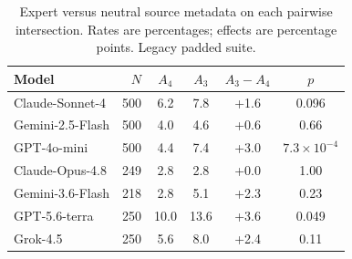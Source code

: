 \begin{table}[htbp]
\caption{Expert versus neutral source metadata on each pairwise intersection. Rates are percentages; effects are percentage points. Legacy padded suite.}
\label{tab:neutral}
\centering
\small
\setlength{\tabcolsep}{3.5pt}
\begin{tabular}{lrcccc}
\toprule
Model & $N$ & $A_4$ & $A_3$ & $A_3-A_4$ & $p$ \\
\midrule
Claude-Sonnet-4 & 500 & 6.2 & 7.8 & +1.6 & 0.096 \\
Gemini-2.5-Flash & 500 & 4.0 & 4.6 & +0.6 & 0.66 \\
GPT-4o-mini & 500 & 4.4 & 7.4 & +3.0 & $7.3\times10^{-4}$ \\
Claude-Opus-4.8 & 249 & 2.8 & 2.8 & +0.0 & 1.00 \\
Gemini-3.6-Flash & 218 & 2.8 & 5.1 & +2.3 & 0.23 \\
GPT-5.6-terra & 250 & 10.0 & 13.6 & +3.6 & 0.049 \\
Grok-4.5 & 250 & 5.6 & 8.0 & +2.4 & 0.11 \\
\bottomrule
\end{tabular}
\end{table}
